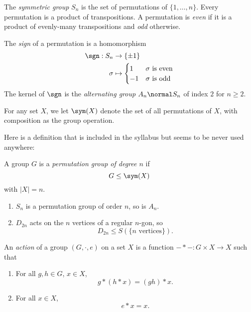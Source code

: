 \documentclass[a4paper]{article}
\begin{document}
The \emph{symmetric group} \(S_n\) is the set of permutations of \(\{1, \dots, n\}\). Every permutation is a product of transpositions. A permutation is \emph{even} if it is a product of evenly-many transpositions and \emph{odd} otherwise.

The \emph{sign} of a permutation is a homomorphism
\begin{align*}
  \sgn: S_n &\to \{\pm 1\} \\
  \sigma &\mapsto
           \begin{cases}
             1 & \sigma \text{ is even} \\
             -1 & \sigma \text{ is odd}
           \end{cases}
\end{align*}
The kernel of \(\sgn\) is the \emph{alternating group} \(A_n \normal S_n\) of index \(2\) for \(n \geq 2\).

For any set \(X\), we let \(\sym(X)\) denote the set of all permutations of \(X\), with composition as the group operation.

Here is a definition that is included in the syllabus but seems to be never used anywhere:

\begin{definition}
  A group \(G\) is a \emph{permutation group of degree \(n\)} if
  \[
    G \leq \sym(X)
  \]
  with \(|X| = n\).
\end{definition}

\begin{eg}\leavevmode
  \begin{enumerate}
  \item \(S_n\) is a permutation group of order \(n\), so is \(A_n\).
  \item \(D_{2n}\) acts on the \(n\) vertices of a regular \(n\)-gon, so
    \[
      D_{2n} \leq S(\{n \text{ vertices}\}).
    \]
  \end{enumerate}
\end{eg}

\begin{definition}
  An \emph{action} of a group \((G, \cdot, e)\) on a set \(X\) is a function \(- * - : G \times X \to X\) such that
  \begin{enumerate}
  \item For all \(g, h \in G\), \(x \in X\),
    \[
      g * (h * x) = (gh) * x.
    \]
  \item For all \(x \in X\),
    \[
      e * x = x.
    \]
  \end{enumerate}
\end{definition}
\end{document}
